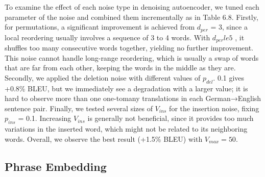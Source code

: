 	\begin{table}[H]

	\centering

	\label{tab:denoising}
		\caption{Different artificial noises}
\end{table}
To examine the effect of each noise type in denoising
autoencoder, we tuned each parameter of the noise and combined them incrementally as in Table 6.8.  Firstly, for permutations, a significant improvement is achieved from $d_{per}$ = 3, since a local
reordering usually involves a sequence of 3 to 4
words. With $d_{per} le 5$ , it shuffles too many consecutive
words together, yielding no further improvement.
This noise cannot handle long-range reordering, which is usually a swap of words that are far from each other, keeping the words in the
middle as they are. \\
Secondly, we applied the deletion noise with
different values of $p_{del}$. 0.1 gives +0.8\% BLEU, but we immediately see a degradation with a larger value; it is hard to observe more than one one-tomany
translations in each German→English sentence pair.
Finally, we tested several sizes of $V_{ins}$ for the
insertion noise, fixing $p_{ins}$ = 0.1. Increasing $V_{ins}$
is generally not beneficial, since it provides too
much variations in the inserted word, which might
not be related to its neighboring words. Overall,
we observe the best result (+1.5\% BLEU) with
$V_{max} = 50$.



\subsection{Phrase Embedding}

